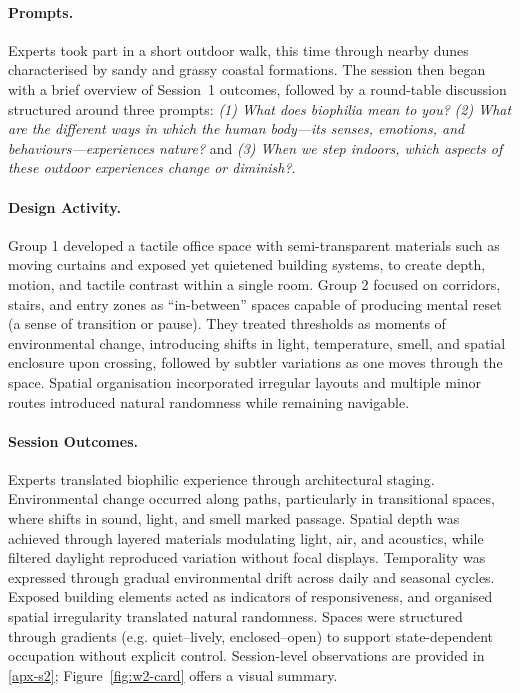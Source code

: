 \paragraph{Prompts.}
Experts took part in a short outdoor walk, this time through nearby dunes characterised by sandy and grassy coastal formations. The session then began with a brief overview of Session~1 outcomes, followed by a round-table discussion structured around three prompts: \emph{(1) What does biophilia mean to you?} \emph{(2) What are the different ways in which the human body—its senses, emotions, and behaviours—experiences nature?} and \emph{(3) When we step indoors, which aspects of these outdoor experiences change or diminish?}.

\paragraph{Design Activity.}
Group 1 developed a tactile office space with semi-transparent materials such as moving curtains and exposed yet quietened building systems, to create depth, motion, and tactile contrast within a single room. Group 2  focused on corridors, stairs, and entry zones as ``in-between'' spaces capable of producing mental reset (a sense of transition or pause). They treated thresholds as moments of environmental change, introducing shifts in light, temperature, smell, and spatial enclosure upon crossing, followed by subtler variations as one moves through the space. Spatial organisation incorporated irregular layouts and multiple minor routes introduced  natural randomness while remaining navigable.

\paragraph{Session Outcomes.}  
Experts translated biophilic experience through architectural staging. Environmental change occurred along paths, particularly in transitional spaces, where shifts in sound, light, and smell marked passage. Spatial depth was achieved through layered materials modulating light, air, and acoustics, while filtered daylight reproduced variation without focal displays. Temporality was expressed through gradual environmental drift across daily and seasonal cycles. Exposed building elements acted as indicators of responsiveness, and organised spatial irregularity translated natural randomness. Spaces were structured through gradients (e.g. quiet–lively, enclosed–open) to support state-dependent occupation without explicit control. Session-level observations are provided in \autoref{apx-s2}; Figure~\ref{fig:w2-card} offers a visual summary.

